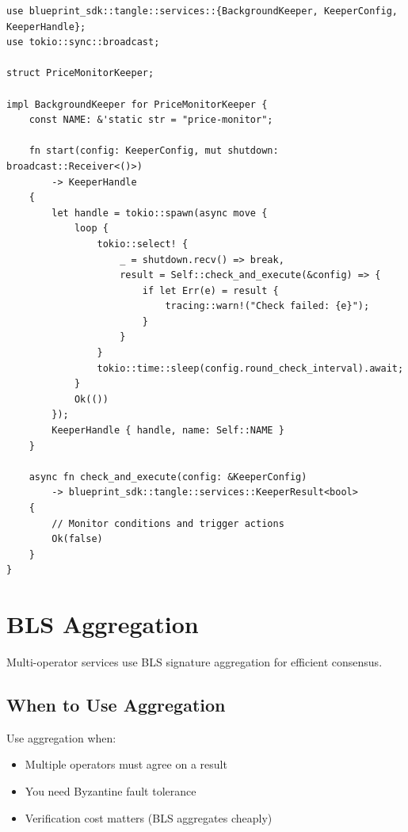 \documentclass[11pt,a4paper]{article}
\begin{document}
\begin{lstlisting}
use blueprint_sdk::tangle::services::{BackgroundKeeper, KeeperConfig, KeeperHandle};
use tokio::sync::broadcast;

struct PriceMonitorKeeper;

impl BackgroundKeeper for PriceMonitorKeeper {
    const NAME: &'static str = "price-monitor";

    fn start(config: KeeperConfig, mut shutdown: broadcast::Receiver<()>)
        -> KeeperHandle
    {
        let handle = tokio::spawn(async move {
            loop {
                tokio::select! {
                    _ = shutdown.recv() => break,
                    result = Self::check_and_execute(&config) => {
                        if let Err(e) = result {
                            tracing::warn!("Check failed: {e}");
                        }
                    }
                }
                tokio::time::sleep(config.round_check_interval).await;
            }
            Ok(())
        });
        KeeperHandle { handle, name: Self::NAME }
    }

    async fn check_and_execute(config: &KeeperConfig)
        -> blueprint_sdk::tangle::services::KeeperResult<bool>
    {
        // Monitor conditions and trigger actions
        Ok(false)
    }
}
\end{lstlisting}

\section{BLS Aggregation}

Multi-operator services use BLS signature aggregation for efficient consensus.

\subsection{When to Use Aggregation}

Use aggregation when:
\begin{itemize}[noitemsep]
    \item Multiple operators must agree on a result
    \item You need Byzantine fault tolerance
    \item Verification cost matters (BLS aggregates cheaply)
\end{itemize}
\end{document}
